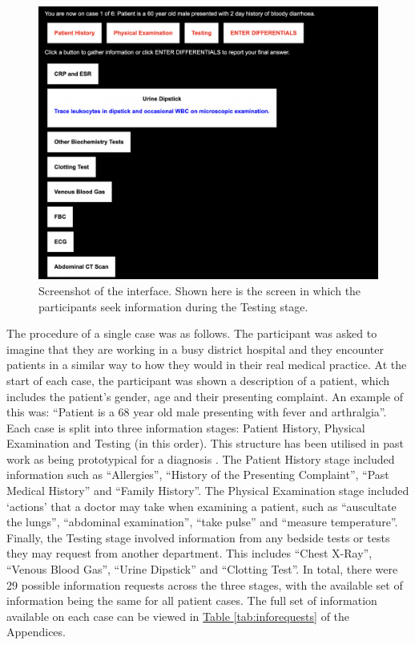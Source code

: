 \documentclass[a4paper, nobind]{templates/ociamthesis}
\begin{document}
\newpage

\begin{figure}[H]

{\centering \includegraphics[width=1\linewidth]{./assets/Screenshot1} 

}

\caption[Online Study: Screenshot 1]{Screenshot of the interface. Shown here is the screen in which the participants seek information during the Testing stage.}\label{fig:screenshot1}
\end{figure}

The procedure of a single case was as follows. The participant was asked to imagine that they are working in a busy district hospital and they encounter patients in a similar way to how they would in their real medical practice. At the start of each case, the participant was shown a description of a patient, which includes the patient's gender, age and their presenting complaint. An example of this was: ``Patient is a 68 year old male presenting with fever and arthralgia''. Each case is split into three information stages: Patient History, Physical Examination and Testing (in this order). This structure has been utilised in past work as being prototypical for a diagnosis \autocite{hampton_relative_1975,peterson_contributions_1992}. The Patient History stage included information such as ``Allergies'', ``History of the Presenting Complaint'', ``Past Medical History'' and ``Family History''. The Physical Examination stage included `actions' that a doctor may take when examining a patient, such as ``auscultate the lungs'', ``abdominal examination'', ``take pulse'' and ``measure temperature''. Finally, the Testing stage involved information from any bedside tests or tests they may request from another department. This includes ``Chest X-Ray'', ``Venous Blood Gas'', ``Urine Dipstick'' and ``Clotting Test''. In total, there were 29 possible information requests across the three stages, with the available set of information being the same for all patient cases. The full set of information available on each case can be viewed in \hyperref[tab:inforequests]{Table \ref{tab:inforequests}} of the Appendices.\\
\end{document}
